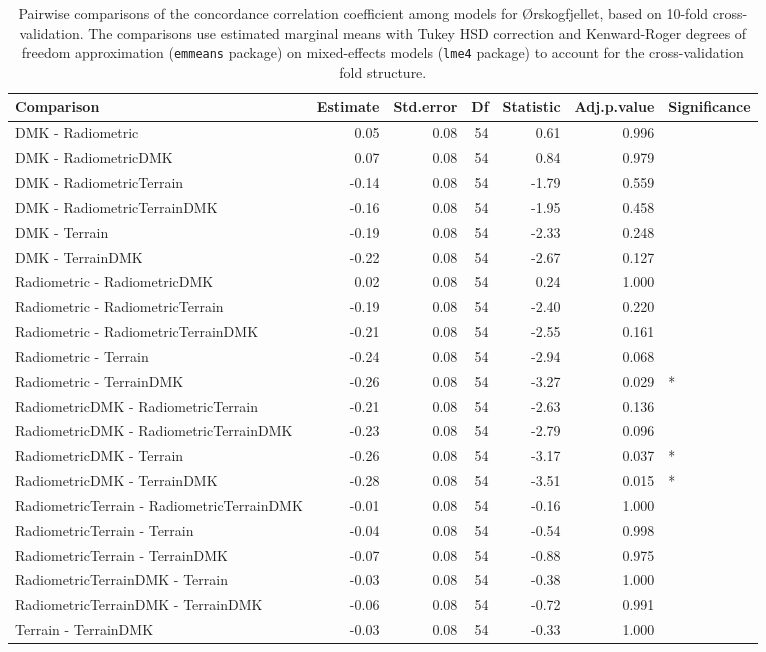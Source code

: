 \documentclass[soil, manuscript]{copernicus}
\begin{document}
\begin{table}[h]

\caption{\label{tab:pairwiseOrskogCCC}Pairwise comparisons of the concordance correlation coefficient among models for Ørskogfjellet, based on 10-fold cross-validation. The comparisons use estimated marginal means with Tukey HSD correction and Kenward-Roger degrees of freedom approximation (\texttt{emmeans} package) on mixed-effects models (\texttt{lme4} package) to account for the cross-validation fold structure.}
\centering
\begin{tabular}[t]{lrrrrrl}
\hline
Comparison & Estimate & Std.error & Df & Statistic & Adj.p.value & Significance\\
\hline
DMK - Radiometric & 0.05 & 0.08 & 54 & 0.61 & 0.996 & \\
DMK - RadiometricDMK & 0.07 & 0.08 & 54 & 0.84 & 0.979 & \\
DMK - RadiometricTerrain & -0.14 & 0.08 & 54 & -1.79 & 0.559 & \\
DMK - RadiometricTerrainDMK & -0.16 & 0.08 & 54 & -1.95 & 0.458 & \\
DMK - Terrain & -0.19 & 0.08 & 54 & -2.33 & 0.248 & \\
DMK - TerrainDMK & -0.22 & 0.08 & 54 & -2.67 & 0.127 & \\
Radiometric - RadiometricDMK & 0.02 & 0.08 & 54 & 0.24 & 1.000 & \\
Radiometric - RadiometricTerrain & -0.19 & 0.08 & 54 & -2.40 & 0.220 & \\
Radiometric - RadiometricTerrainDMK & -0.21 & 0.08 & 54 & -2.55 & 0.161 & \\
Radiometric - Terrain & -0.24 & 0.08 & 54 & -2.94 & 0.068 & \\
Radiometric - TerrainDMK & -0.26 & 0.08 & 54 & -3.27 & 0.029 & *\\
RadiometricDMK - RadiometricTerrain & -0.21 & 0.08 & 54 & -2.63 & 0.136 & \\
RadiometricDMK - RadiometricTerrainDMK & -0.23 & 0.08 & 54 & -2.79 & 0.096 & \\
RadiometricDMK - Terrain & -0.26 & 0.08 & 54 & -3.17 & 0.037 & *\\
RadiometricDMK - TerrainDMK & -0.28 & 0.08 & 54 & -3.51 & 0.015 & *\\
RadiometricTerrain - RadiometricTerrainDMK & -0.01 & 0.08 & 54 & -0.16 & 1.000 & \\
RadiometricTerrain - Terrain & -0.04 & 0.08 & 54 & -0.54 & 0.998 & \\
RadiometricTerrain - TerrainDMK & -0.07 & 0.08 & 54 & -0.88 & 0.975 & \\
RadiometricTerrainDMK - Terrain & -0.03 & 0.08 & 54 & -0.38 & 1.000 & \\
RadiometricTerrainDMK - TerrainDMK & -0.06 & 0.08 & 54 & -0.72 & 0.991 & \\
Terrain - TerrainDMK & -0.03 & 0.08 & 54 & -0.33 & 1.000 & \\
\hline
\end{tabular}
\end{table}
\clearpage
\end{document}
